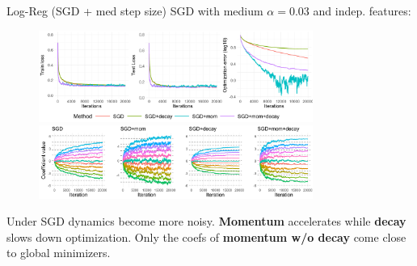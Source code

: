 \documentclass[11pt,compress,t,notes=noshow, xcolor=table]{beamer}
\begin{document}
\begin{vbframe}{Log-Reg (SGD + med step size)}
\vspace{-0.4cm}
SGD with medium $\alpha=0.03$ and indep. features:
\begin{figure}
            \includegraphics[width=0.8\textwidth]{slides/04-multivariate-first-order/figure_man/simu_linmod/SGD_log_med_lr_iters.pdf} \\
             \includegraphics[width=0.8\textwidth]{slides/04-multivariate-first-order/figure_man/simu_linmod/SGD_log_coef_med.pdf}\\
            \begin{footnotesize}
            \end{footnotesize}
\end{figure}
Under SGD dynamics become more noisy. \textbf{Momentum} accelerates while \textbf{decay} slows down optimization. Only the coefs of \textbf{momentum w/o decay} come close to global minimizers.
\end{vbframe}
\end{document}
